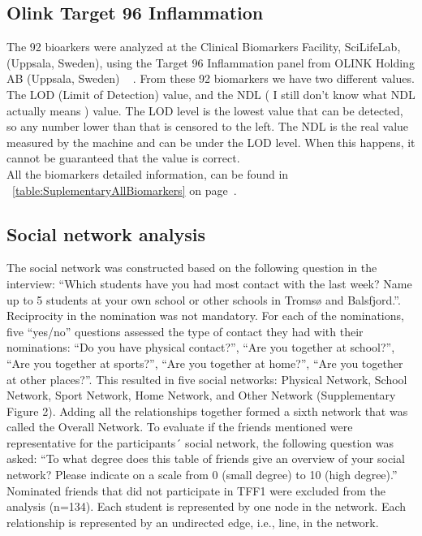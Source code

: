 \documentclass[10pt, a4paper, twocolumn]{article} %
\begin{document}
\subsection{Olink Target 96 Inflammation} 

The 92 bioarkers were analyzed at the Clinical Biomarkers Facility, SciLifeLab, (Uppsala, Sweden), using the Target 96 Inflammation panel from OLINK Holding AB (Uppsala, Sweden) ~\cite{ref:OlinkInflammation} . From these 92 biomarkers we have two different values. The LOD (Limit of Detection) value, and the NDL ( I still don’t know what NDL actually means ) value. The LOD level is the lowest value that can be detected, so any number lower than that is censored to the left. The NDL is the real value measured by the machine and can be under the LOD level. When this happens, it cannot be guaranteed that the value is correct.\\

All the biomarkers detailed information, can be found in ~\ref{table:SuplementaryAllBiomarkers} on page~\pageref{table:SuplementaryAllBiomarkers}.\\


\subsection{Social network analysis}

The social network was constructed based on the following question in the interview: “Which students have you had most contact with the last week? Name up to 5 students at your own school or other schools in Tromsø and Balsfjord.”. Reciprocity in the nomination was not mandatory. For each of the nominations, five “yes/no” questions assessed the type of contact they had with their nominations: “Do you have physical contact?”, “Are you together at school?”, “Are you together at sports?”, “Are you together at home?”, “Are you together at other places?”. This resulted in five social networks: Physical Network, School Network, Sport Network, Home Network, and Other Network (Supplementary Figure 2). Adding all the relationships together formed a sixth network that was called the Overall Network. To evaluate if the friends mentioned were representative for the participants´ social network, the following question was asked: “To what degree does this table of friends give an overview of your social network? Please indicate on a scale from 0 (small degree) to 10 (high degree).”  Nominated friends that did not participate in TFF1 were excluded from the analysis (n=134). Each student is represented by one node in the network. Each relationship is represented by an undirected edge, i.e., line, in the network.\\
\end{document}
